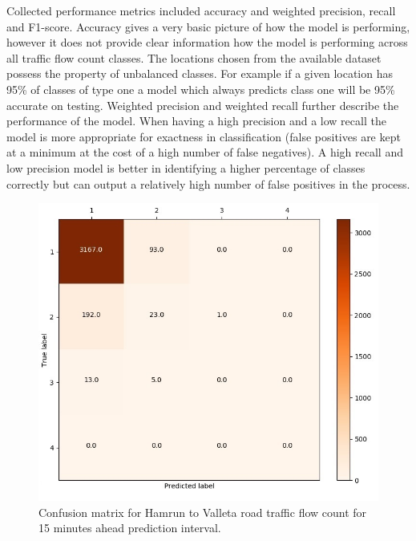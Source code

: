 \documentclass[12pt, a4paper]{report}
\theoremstyle{definition}
\theoremstyle{definition}%
\theoremstyle{definition}%
\theoremstyle{definition}%
\theoremstyle{definition}%
\theoremstyle{definition}%
\begin{document}
Collected performance metrics included accuracy and weighted precision, recall and F1-score. Accuracy gives a very basic picture of how the model is performing, however it does not provide clear information how the model is performing across all traffic flow count classes. The locations chosen from the available dataset possess the property of unbalanced classes. For example if a given location has 95\% of classes of type one a model which always predicts class one will be 95\% accurate on testing. Weighted precision and weighted recall further describe the performance of the model. When having a high precision and a low recall the model is more appropriate for exactness in classification (false positives are kept at a minimum at the cost of a high number of false negatives). A high recall and low precision model is better in identifying  a higher percentage of classes correctly but can output a relatively high number of false positives in the process.   

\begin{figure}[h]	
	\includegraphics[scale=0.5]{confusion_matrix_hamrun_valletta_342_4bin_15min.jpg}
	\centering
	\caption[Confusion matrix Hamrun to Valletta traffic flow prediction]{Confusion matrix for Hamrun to Valleta road traffic flow count for 15 minutes ahead prediction interval.}
	\label{fig:confusion_matrix_hamrun_valletta_15min}
\end{figure}
\end{document}
